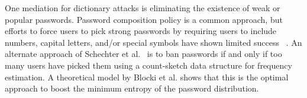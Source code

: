  One mediation for dictionary attacks is eliminating the existence of weak or popular passwords. Password composition policy is a common approach, but efforts to force users to pick strong passwords by requiring users to include numbers, capital letters, and/or special symbols have shown limited success ~\cite{KSKMBCCE:SIGCHI11, BKPS:ACMEC13}. An alternate approach of Schechter et al.~\cite{HTS:SchHerMit10} is to ban passwords if and only if too many users have picked them using a count-sketch data structure for frequency estimation. A theoretical model by Blocki et al. \cite{BKPS:ACMEC13} shows that this is the optimal approach to boost the minimum entropy of the password distribution.  




